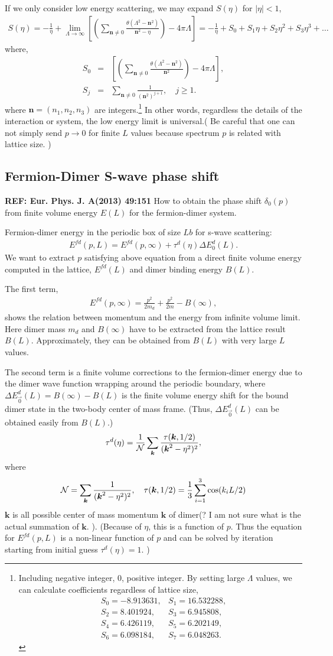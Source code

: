 \documentclass[10pt]{book}
\def\bm{\boldsymbol}
\newcommand{\bea}{\begin{eqnarray}}
\newcommand{\eea}{\end{eqnarray}}
\newcommand{\no}{\nonumber \\}
\def\vk{{\bm k}}
\def\vn{{\bm n}}
\begin{document}
If we only consider low energy scattering, we may expand $S(\eta)$ for $|\eta|<1$,
\bea 
S(\eta)=-\frac{1}{\eta}+\lim_{\Lambda\to \infty}\left[ 
    \left( \sum_{\vn\neq 0}\frac{\theta(\Lambda^2-\vn^2)}{\vn^2-\eta} \right) 
   -4\pi\Lambda \right]
   =-\frac{1}{\eta}+S_0+S_1\eta+S_2 \eta^2+S_3 \eta^3+\dots 
\eea 
where,
\bea
S_0&=&\left[ \left( \sum_{\vn\neq 0}\frac{\theta(\Lambda^2-\vn^2)}{\vn^2} \right) 
   -4\pi\Lambda \right],\no 
S_j&=&\sum_{\vn\neq 0}\frac{1}{(\vn^2)^{j+1}},\quad j\geq 1.
\eea 
where ${\bm n}=(n_1,n_2,n_3)$ are integers.\footnote{
Including negative integer, 0, positive integer.
By setting large $\Lambda$ values, we can calculate coefficients 
regardless of lattice size,
\bea 
& S_0=-8.913631, & S_1=16.532288, \no 
& S_2=8.401924,  & S_3=6.945808, \no 
& S_4=6.426119,  & S_5=6.202149, \no 
& S_6 = 6.098184, & S_7=6.048263.
\eea 
 } In other words, regardless the details of the interaction or system,
the low energy limit is universal.( Be careful that one can not simply send $p\to 0$
for finite $L$ values because spectrum $p$ is related with lattice size.  )

\subsection{Fermion-Dimer S-wave phase shift }
{\bf REF: Eur. Phys. J. A(2013) 49:151}
How to obtain the phase shift $\delta_0(p)$ from finite volume energy $E(L)$ for the fermion-dimer system.

Fermion-dimer energy in the periodic box of size $Lb$ for s-wave scattering:
\bea 
E^{fd}(p,L)=E^{fd}(p,\infty)+\tau^d(\eta)\Delta E_0^d(L).
\eea 
We want to extract $p$ satisfying above equation 
from a direct finite volume energy computed in the lattice, $E^{fd}(L)$
and dimer binding energy $B(L)$.

The first term,
\bea 
E^{fd}(p,\infty)=\frac{p^2}{2m_d}+\frac{p^2}{2m}-B(\infty),
\eea 
shows the relation between momentum and the energy from infinite volume limit. 
Here dimer mass $m_d$ and $B(\infty)$ have to be extracted from the lattice result $B(L)$. 
Approximately, they can be obtained from $B(L)$ with very large $L$ values. 

The second term is a finite volume corrections to the fermion-dimer energy
due to the dimer wave function wrapping around the periodic boundary,
where $\Delta E^d_{\vec 0}(L)=B(\infty)-B(L)$ is the finite volume energy shift for the
bound dimer state in the two-body center of mass frame. 
 (Thus, $\Delta E^d_{\vec 0}(L)$ can be obtained easily from $B(L)$.) 
 \bea 
 \tau^d(\eta) = \frac{1}{{\cal N}} \sum_{\vk} \frac{\tau(\vk,1/2)}{(\vk^2-\eta^2)^2},
 \eea 
 where
 \bea 
 {\cal N}=\sum_\vk \frac{1}{(\vk^2-\eta^2)^2},\quad \tau(\vk,1/2)=\frac{1}{3}\sum_{i=1}^3 \cos(k_i L/2)
 \eea 
 $\vk$ is all possible center of mass momentum $\vk$ of dimer(?
 I am not sure what is the actual summation of $\vk$. ).
 (Because of $\eta$, this is a function of $p$. 
 Thus the equation for $E^{fd}(p,L)$ is a non-linear function of $p$
 and can be solved by iteration starting from initial guess $\tau^d(\eta)=1$.
 ) 
\end{document}
